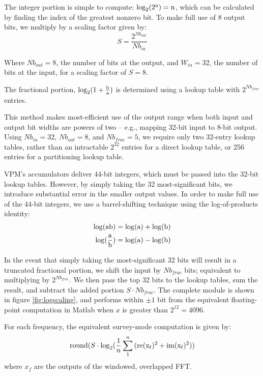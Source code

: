 The integer portion is simple to compute: $\rm{log}_2({2^{n}}) = n$, which can be calculated by finding the index of the greatest nonzero bit. To make full use of 8 output bits, we multiply by a scaling factor given by:
\begin{equation}
S = \frac{2^{Nb_{out}}}{Nb_{in}}
\end{equation}

Where $Nb_{out} = 8$, the number of bits at the output, and $W_{in} = 32$, the number of bits at the input, for a scaling factor of $S = 8$.

The fractional portion, $\rm{log}_2(1 + \frac{b}{a})$ is determined using a lookup table with $2^{Nb_{frac}}$ entries.

This method makes most-efficient use of the output range when both input and output bit widths are powers of two -- e.g., mapping 32-bit input to 8-bit output. Using $Nb_{in} = 32$, $Nb_{out} = 8$, and $Nb_{frac} = 5$, we require only two 32-entry lookup tables, rather than an intractable $2^{32}$ entries for a direct lookup table, or 256 entries for a partitioning lookup table.

VPM's accumulators deliver 44-bit integers, which must be passed into the 32-bit lookup tables. However, by simply taking the 32 most-significant bits, we introduce substantial error in the smaller output values. In order to make full use of the 44-bit integers, we use a barrel-shifting technique using the log-of-products identity:
\begin{eqnarray}
\rm{log}(ab) = \rm{log}(a) + \rm{log}(b) \\
\rm{log}(\frac{a}{b}) = \rm{log}(a) - \rm{log}(b) 
\end{eqnarray}

In the event that simply taking the most-significant 32 bits will result in a truncated fractional portion, we shift the input by $Nb_{frac}$ bits; equivalent to multiplying by $2^{Nb_{frac}}$. We then pass the top 32 bits to the lookup tables, sum the result, and subtract the added portion $S\cdot Nb_{frac}$. The complete module is shown in figure \ref{fig:logscaling}, and performs within $\pm 1$ bit from the equivalent floating-point computation in Matlab when $x$ is greater than $2^{12} = 4096$.



For each frequency, the equivalent survey-mode computation is given by:
\begin{equation}
{\rm round}(S \cdot {\rm log}_2(\frac{1}{n}\sum_1^n{(\rm{re}(x_f)^2 + \rm{im}(x_f)^2)})
\end{equation}
where $x_f$ are the outputs of the windowed, overlapped FFT.


